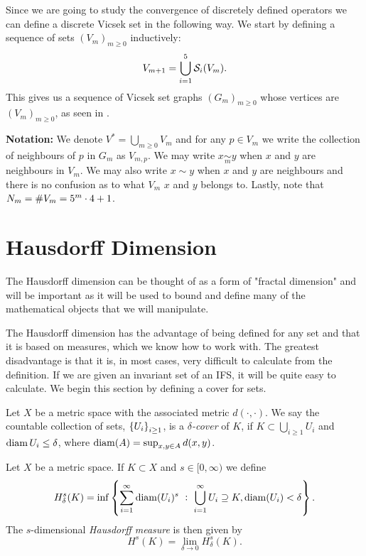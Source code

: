 \medskip
Since we are going to study the convergence of discretely defined operators we can define a discrete Vicsek set in the following way. We start by defining a sequence of sets $(V_m)_{m \geq 0}$ inductively:
\begin{equation}
	V_{m+1} = \bigcup_{i = 1}^{5} \mathcal{S}_i(V_m).
\end{equation}
This gives us a sequence of Vicsek set graphs $(G_m)_{m\geq 0}$ whose vertices are $(V_m)_{m \geq 0}$, as seen in . 

\medskip
\textbf{Notation:} We denote $V^{\ast} = \bigcup_{m \geq 0} V_m$ and for any $p \in V_m$ we write the collection of neighbours of $p$ in $G_m$ as $V_{m,p}$. We may write $x \underset{m}{\sim} y$ when $x$ and $y$ are neighbours in $V_m$. We may also write $x \sim y$ when $x$ and $y$ are neighbours and there is no confusion as to what $V_m$ $x$ and $y$ belongs to. Lastly, note that $N_m = \# V_m = 5^{m}\cdot 4 + 1$.



\section{Hausdorff Dimension}

The Hausdorff dimension can be thought of as a form of "fractal dimension" and will be important as it will be used to bound and define many of the mathematical objects that we will manipulate. 

The Hausdorff dimension has the advantage of being defined for any set and that it is based on measures, which we know how to work with. The greatest disadvantage is that it is, in most cases, very difficult to calculate from the definition. If we are given an invariant set of an IFS, it will be quite easy to calculate. We begin this section by defining a cover for sets.

\medskip
\begin{defi}\label{deltaCover}
	Let $X$ be a metric space with the associated metric $d(\cdot, \cdot)$. We say the countable collection of sets, $\cbr{U_i}_{i \geq 1}$, is a \emph{$\delta$-cover} of $K$, if $K \subset \bigcup_{i \geq 1} U_i$ and $\operatorname{diam} U_i \leq \delta$, where $\operatorname{diam}(A)= \sup_{x, y \in A}d(x,y)$.
\end{defi}

\medskip
\begin{defi}
	Let $X$ be a metric space. If $K \subset X$ and $s \in [0, \infty)$ we define
	\begin{equation}
		H^{s}_{\delta}(K) = \inf \cbr{\sum_{i =1}^{\infty} \diam(U_i)^s \ : \ \bigcup_{i = 1}^{\infty} U_i \supseteq K, \diam(U_i) < \delta}.
	\end{equation}
	The $s$-dimensional \emph{Hausdorff measure} is then given by
	\begin{equation}
		H^s(K) = \lim_{\delta \to 0} H^{s}_{\delta}(K).
	\end{equation}
\end{defi}

